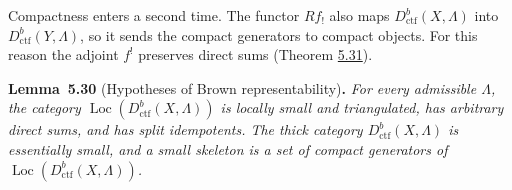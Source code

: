 \documentclass[11pt]{article}
\newenvironment{bpstatement}[2]{\par\addvspace{0.6\baselineskip}\noindent\textbf{#1}#2\textbf{.}\enspace\ignorespaces}
  {\par\addvspace{0.4\baselineskip}}
\newenvironment{bpstatementit}[2]{\begin{bpstatement}{#1}{#2}\itshape\ignorespaces}{\end{bpstatement}}
\providecommand{\Loc}{}\renewcommand{\Loc}{\operatorname{Loc}}
\begin{document}
Compactness enters a second time. The functor \(Rf_!\) also maps \(D^b_{\mathrm{ctf}}(X,\Lambda)\) into \(D^b_{\mathrm{ctf}}(Y,\Lambda)\), so it sends the compact generators to compact objects. For this reason the adjoint \(f^!\) preserves direct sums (Theorem \hyperref[bp506]{5.31}).

\label{bp503}%
\begin{bpstatementit}{Lemma~5.30}{ (Hypotheses of Brown representability)}
For every admissible \(\Lambda\), the category \(\Loc(D^b_{\mathrm{ctf}}(X,\Lambda))\) is locally small and triangulated, has arbitrary direct sums, and has split idempotents. The thick category \(D^b_{\mathrm{ctf}}(X,\Lambda)\) is essentially small, and a small skeleton is a set of compact generators of \(\Loc(D^b_{\mathrm{ctf}}(X,\Lambda))\).
\end{bpstatementit}
\end{document}
